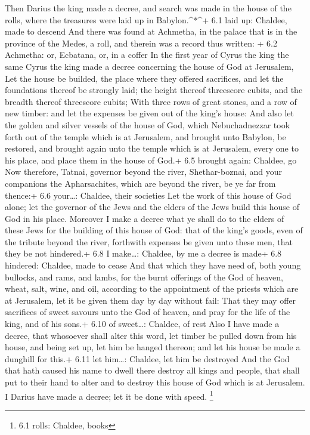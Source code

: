  Then Darius the king made a decree, and search was made in
the house of the rolls, where the treasures were laid up in
Babylon.\^{}*\^{}+ 6.1 laid up: Chaldee, made to descend 
And there was found at Achmetha, in the palace that is in the province
of the Medes, a roll, and therein was a record thus written: + 6.2
Achmetha: or, Ecbatana, or, in a coffer  In the first year
of Cyrus the king the same Cyrus the king made a decree concerning the
house of God at Jerusalem, Let the house be builded, the place where
they offered sacrifices, and let the foundations thereof be strongly
laid; the height thereof threescore cubits, and the breadth thereof
threescore cubits;  With three rows of great stones, and a
row of new timber: and let the expenses be given out of the king's
house:  And also let the golden and silver vessels of the
house of God, which Nebuchadnezzar took forth out of the temple which is
at Jerusalem, and brought unto Babylon, be restored, and brought again
unto the temple which is at Jerusalem, every one to his place, and place
them in the house of God.+ 6.5 brought again: Chaldee, go 
Now therefore, Tatnai, governor beyond the river, Shethar-boznai, and
your companions the Apharsachites, which are beyond the river, be ye far
from thence:+ 6.6 your\ldots: Chaldee, their societies  Let
the work of this house of God alone; let the governor of the Jews and
the elders of the Jews build this house of God in his place.
 Moreover I make a decree what ye shall do to the elders of
these Jews for the building of this house of God: that of the king's
goods, even of the tribute beyond the river, forthwith expenses be given
unto these men, that they be not hindered.+ 6.8 I make\ldots: Chaldee,
by me a decree is made+ 6.8 hindered: Chaldee, made to cease
 And that which they have need of, both young bullocks, and
rams, and lambs, for the burnt offerings of the God of heaven, wheat,
salt, wine, and oil, according to the appointment of the priests which
are at Jerusalem, let it be given them day by day without fail:
 That they may offer sacrifices of sweet savours unto the
God of heaven, and pray for the life of the king, and of his sons.+ 6.10
of sweet\ldots: Chaldee, of rest  Also I have made a
decree, that whosoever shall alter this word, let timber be pulled down
from his house, and being set up, let him be hanged thereon; and let his
house be made a dunghill for this.+ 6.11 let him\ldots: Chaldee, let him
be destroyed  And the God that hath caused his name to
dwell there destroy all kings and people, that shall put to their hand
to alter and to destroy this house of God which is at Jerusalem. I
Darius have made a decree; let it be done with speed. \footnote{6.1
  rolls: Chaldee, books}

